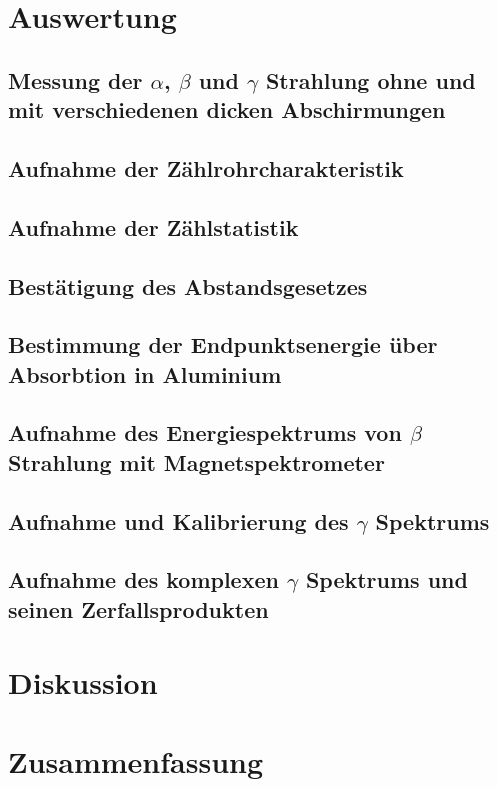 \documentclass[12pt,english,ngerman]{scrartcl}
\begin{document}




\section{Auswertung}\label{sec:Auswertung}

\subsection{Messung der \texorpdfstring{$\alpha$}{alpha}, \texorpdfstring{$\beta$}{beta} und \texorpdfstring{$\gamma$}{gamma} Strahlung ohne und mit verschiedenen dicken Abschirmungen}



\subsection{Aufnahme der Zählrohrcharakteristik}




\subsection{Aufnahme der Zählstatistik}


\subsection{Bestätigung des Abstandsgesetzes}


\subsection{Bestimmung der Endpunktsenergie über Absorbtion in Aluminium}


\subsection{Aufnahme des Energiespektrums von \texorpdfstring{$\beta$}{beta} Strahlung mit Magnetspektrometer}


\subsection{Aufnahme und Kalibrierung des \texorpdfstring{$\gamma$}{gamma} Spektrums}


\subsection{Aufnahme des komplexen \texorpdfstring{$\gamma$}{gamma} Spektrums und seinen Zerfallsprodukten}






\section*{Diskussion}\label{sec:diskussion}



\section{Zusammenfassung}



\newpage

\printbibliography
\listoffigures
\listoftables
\end{document}
